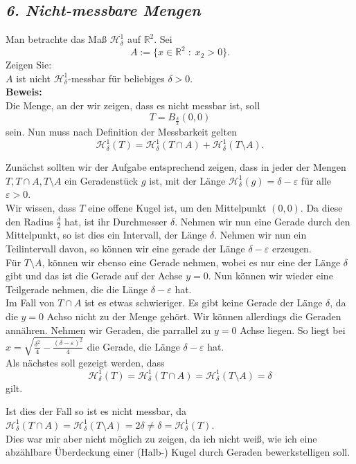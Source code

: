 \subsection*{\itshape 6. Nicht-messbare Mengen}

Man betrachte das Maß $\mathcal{H}_\delta^1$ auf $\mathbb{R}^2$. Sei
$$
    A := \{ x \in \mathbb{R}^2 \; : \; x_2 > 0 \}.
$$
Zeigen Sie:\\
$A$ ist nicht $\mathcal{H}_\delta^1$-messbar für beliebiges $\delta > 0$.\\

\textbf{Beweis:}\\

Die Menge, an der wir zeigen, dass es nicht messbar ist, soll
$$
    T = B_{\frac{\delta}{2}} (0,0)
$$
sein. Nun muss nach Definition der Messbarkeit gelten
$$
    \mathcal{H}_\delta^1 (T) = \mathcal{H}_\delta^1 (T \cap A) + \mathcal{H}_\delta^1 (T \setminus A).
$$

Zunächst sollten wir der Aufgabe entsprechend zeigen, dass in jeder der Mengen $T, T \cap A, T \setminus A$
ein Geradenstück $g$ ist, mit der Länge $\mathcal{H}_\delta^1 (g) = \delta - \varepsilon$ für alle $\varepsilon > 0$.\\

Wir wissen, dass $T$ eine offene Kugel ist, um den Mittelpunkt $(0,0)$. Da diese den Radius $\frac{\delta}{2}$ hat,
ist ihr Durchmesser $\delta$. Nehmen wir nun eine Gerade durch den Mittelpunkt, so ist dies ein Intervall, der
Länge $\delta$. Nehmen wir nun ein Teilintervall davon, so können wir eine gerade der Länge $\delta - \varepsilon$ erzeugen.\\

Für $T \setminus A$, können wir ebenso eine Gerade nehmen, wobei es nur eine der Länge $\delta$ gibt und das ist die Gerade auf der
Achse $y=0$. Nun können wir wieder eine Teilgerade nehmen, die die Länge $\delta - \varepsilon$ hat.\\

Im Fall von $T \cap A$ ist es etwas schwieriger. Es gibt keine Gerade der Länge $\delta$, da die $y=0$ Achso nicht zu der Menge gehört.
Wir können allerdings die Geraden annähren. Nehmen wir Geraden, die parrallel zu $y=0$ Achse liegen. So liegt bei 
$x= \sqrt{\frac{\delta^2}{4} - \frac{(\delta - \varepsilon)^2}{4}}$ die Gerade, die Länge $\delta - \varepsilon$ hat.\\

Als nächstes soll gezeigt werden, dass
$$
    \mathcal{H}^1_\delta (T) = \mathcal{H}^1_\delta(T \cap A) = \mathcal{H}^1_\delta(T \setminus A) = \delta
$$
gilt.

Ist dies der Fall so ist es nicht messbar, da $\mathcal{H}^1_\delta(T \cap A) = \mathcal{H}^1_\delta (T \setminus A) = 2 \delta \not= \delta = \mathcal{H}^1_\delta (T)$.\\

Dies war mir aber nicht möglich zu zeigen, da ich nicht weiß, wie ich eine abzählbare Überdeckung einer (Halb-) Kugel durch Geraden bewerkstelligen soll.
